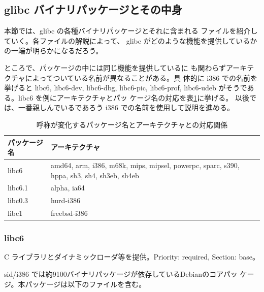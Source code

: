 \documentclass[mingoth,a4paper]{jsarticle}
\begin{document}
\subsection{glibc バイナリパッケージとその中身}

    本節では、glibc の各種バイナリパッケージとそれに含まれる
    ファイルを紹介していく。各ファイルの解説によって、
    glibc がどのような機能を提供しているかの一端が明らかになるだろう。

    ところで、パッケージの中には同じ機能を提供しているに
    も関わらずアーキテクチャによってついている名前が異なることがある。具
    体的に i386 での名前を挙げると libc6, libc6-dev, libc6-dbg, libc6-pic,
    libc6-prof, libc6-udeb がそうである。libc6 を例にアーキテクチャとパッ
    ケージ名の対応を表\ref{archname}に挙げる。
    以後では、一番親しんでいるであろう i386 での名前を使用して説明を進める。

    \begin{table}[h]
    \begin{center}
      {
	\begin{tabular}{l|l} \hline
		パッケージ名 & アーキテクチャ \\ \hline \hline
		libc6 & amd64, arm, i386, m68k, mips, mipsel, powerpc, sparc, s390, hppa, sh3, sh4, sh3eb, sh4eb	\\
		libc6.1 & alpha, ia64 \\
		libc0.3 & hurd-i386 \\
		libc1   & freebsd-i386 \\ \hline
	   \end{tabular}
	}
     \caption{呼称が変化するパッケージ名とアーキテクチャとの対応関係}
     \label{archname}
    \end{center}
    \end{table}

  \subsubsection{libc6}

    C ライブラリとダイナミックローダ等を提供。Priority: required,
    Section: base。

    sid/i386 では約9100バイナリパッケージが依存しているDebianのコアパッ
    ケージ。本パッケージは以下のファイルを含む。
\end{document}
